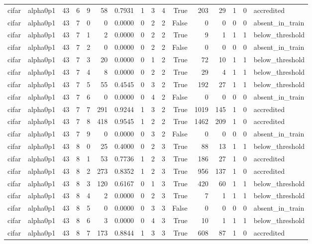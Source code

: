 \begin{tabular}{llrrrrrrrrrrrrrl}
cifar & alpha0p1 & 43 & 6 & 9 & 58 & 0.7931 & 1 & 3 & 4 & True & 203 & 29 & 1 & 0 & accredited \\
cifar & alpha0p1 & 43 & 7 & 0 & 0 & 0.0000 & 0 & 2 & 2 & False & 0 & 0 & 0 & 0 & absent\_in\_train \\
cifar & alpha0p1 & 43 & 7 & 1 & 2 & 0.0000 & 0 & 2 & 2 & True & 9 & 1 & 1 & 1 & below\_threshold \\
cifar & alpha0p1 & 43 & 7 & 2 & 0 & 0.0000 & 0 & 2 & 2 & False & 0 & 0 & 0 & 0 & absent\_in\_train \\
cifar & alpha0p1 & 43 & 7 & 3 & 20 & 0.0000 & 0 & 1 & 2 & True & 72 & 10 & 1 & 1 & below\_threshold \\
cifar & alpha0p1 & 43 & 7 & 4 & 8 & 0.0000 & 0 & 2 & 2 & True & 29 & 4 & 1 & 1 & below\_threshold \\
cifar & alpha0p1 & 43 & 7 & 5 & 55 & 0.4545 & 0 & 3 & 2 & True & 192 & 27 & 1 & 1 & below\_threshold \\
cifar & alpha0p1 & 43 & 7 & 6 & 0 & 0.0000 & 0 & 4 & 2 & False & 0 & 0 & 0 & 0 & absent\_in\_train \\
cifar & alpha0p1 & 43 & 7 & 7 & 291 & 0.9244 & 1 & 3 & 2 & True & 1019 & 145 & 1 & 0 & accredited \\
cifar & alpha0p1 & 43 & 7 & 8 & 418 & 0.9545 & 1 & 2 & 2 & True & 1462 & 209 & 1 & 0 & accredited \\
cifar & alpha0p1 & 43 & 7 & 9 & 0 & 0.0000 & 0 & 3 & 2 & False & 0 & 0 & 0 & 0 & absent\_in\_train \\
cifar & alpha0p1 & 43 & 8 & 0 & 25 & 0.4000 & 0 & 2 & 3 & True & 88 & 13 & 1 & 1 & below\_threshold \\
cifar & alpha0p1 & 43 & 8 & 1 & 53 & 0.7736 & 1 & 2 & 3 & True & 186 & 27 & 1 & 0 & accredited \\
cifar & alpha0p1 & 43 & 8 & 2 & 273 & 0.8352 & 1 & 2 & 3 & True & 956 & 137 & 1 & 0 & accredited \\
cifar & alpha0p1 & 43 & 8 & 3 & 120 & 0.6167 & 0 & 1 & 3 & True & 420 & 60 & 1 & 1 & below\_threshold \\
cifar & alpha0p1 & 43 & 8 & 4 & 2 & 0.0000 & 0 & 2 & 3 & True & 7 & 1 & 1 & 1 & below\_threshold \\
cifar & alpha0p1 & 43 & 8 & 5 & 0 & 0.0000 & 0 & 3 & 3 & False & 0 & 0 & 0 & 0 & absent\_in\_train \\
cifar & alpha0p1 & 43 & 8 & 6 & 3 & 0.0000 & 0 & 4 & 3 & True & 10 & 1 & 1 & 1 & below\_threshold \\
cifar & alpha0p1 & 43 & 8 & 7 & 173 & 0.8844 & 1 & 3 & 3 & True & 608 & 87 & 1 & 0 & accredited \\

\end{tabular}
